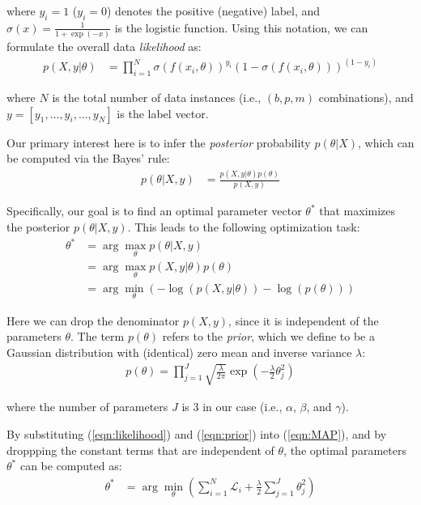 \noindent where $y_i = 1$ ($y_i = 0$) denotes the positive (negative) label, and $\sigma(x) = \frac{1}{1 + \exp(-x)}$ is the logistic function. Using this notation, we can formulate the overall data \emph{likelihood} as:
\begin{align}
\label{eqn:likelihood}
p(X, y | \theta) &= \prod_{i=1}^N \sigma(f(x_i, \theta))^{y_i} \left( 1 - \sigma(f(x_i, \theta)) \right)^{(1 - y_i)}
\end{align}

\noindent where $N$ is the total number of data instances (i.e., $(b,p,m)$ combinations), and $y = [y_1,\ldots,y_i,\ldots,y_N]$ is the label vector.

Our primary interest here is to infer the \emph{posterior} probability $p(\theta | X)$, which can be computed via the Bayes' rule:
\begin{align}
p(\theta | X, y) &= \frac{p(X, y | \theta) p(\theta)}{p(X, y)}
\end{align}

\noindent Specifically, our goal is to find an optimal parameter vector $\theta^{*}$ that maximizes the posterior $p(\theta | X, y)$. This leads to the following optimization task:
\begin{align}
\label{eqn:MAP}
\theta^{*} &= \arg \max_{\theta} p(\theta | X, y) \nonumber\\
&= \arg \max_{\theta} p(X, y | \theta) p(\theta) \nonumber\\
&= \arg \min_{\theta} \left( -\log(p(X, y | \theta)) - \log(p(\theta)) \right)
\end{align}

\noindent Here we can drop the denominator $p(X, y)$, since it is independent of the parameters $\theta$. The term $p(\theta)$ refers to the \emph{prior}, which we define to be a Gaussian distribution with (identical) zero mean and inverse variance $\lambda$:
\begin{align}
\label{eqn:prior}
p(\theta) = \prod_{j=1}^J \sqrt{ \frac{\lambda}{2 \pi} } \exp \left( -\frac{\lambda}{2} \theta_j^2 \right)
\end{align}

\noindent where the number of parameters $J$ is $3$ in our case (i.e., $\alpha$, $\beta$, and $\gamma$).

By substituting (\ref{eqn:likelihood}) and (\ref{eqn:prior}) into (\ref{eqn:MAP}), and by droppping the constant terms that are independent of $\theta$, the optimal parameters $\theta^{*}$ can be computed as:
\begin{align}
\theta^{*} &= \arg \min_{\theta} \left( \sum_{i=1}^N \mathcal{L}_i + \frac{\lambda}{2} \sum_{j=1}^J \theta_j^2 \right)
\end{align}

